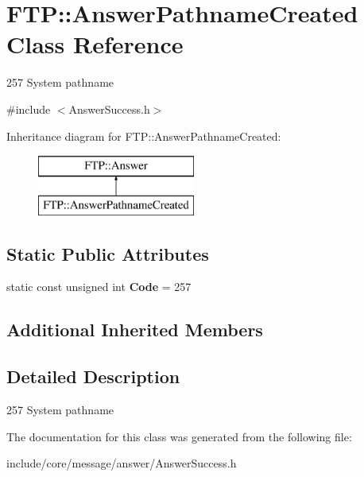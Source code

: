 \hypertarget{class_f_t_p_1_1_answer_pathname_created}{\section{F\-T\-P\-:\-:Answer\-Pathname\-Created Class Reference}
\label{class_f_t_p_1_1_answer_pathname_created}
}


257 System pathname  




{\ttfamily \#include $<$Answer\-Success.\-h$>$}

Inheritance diagram for F\-T\-P\-:\-:Answer\-Pathname\-Created\-:\begin{figure}[H]
\begin{center}
\leavevmode
\includegraphics[height=2.000000cm]{class_f_t_p_1_1_answer_pathname_created}
\end{center}
\end{figure}
\subsection*{Static Public Attributes}
\begin{DoxyCompactItemize}
\item 
\hypertarget{class_f_t_p_1_1_answer_pathname_created_a318289d8af475a7ff1b55b0a7cddc503}{static const unsigned int {\bfseries Code} = 257}\label{class_f_t_p_1_1_answer_pathname_created_a318289d8af475a7ff1b55b0a7cddc503}

\end{DoxyCompactItemize}
\subsection*{Additional Inherited Members}


\subsection{Detailed Description}
257 System pathname 

The documentation for this class was generated from the following file\-:\begin{DoxyCompactItemize}
\item 
include/core/message/answer/Answer\-Success.\-h\end{DoxyCompactItemize}
